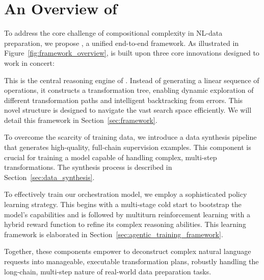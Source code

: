 



\section{An Overview of \sys} 
\label{sec:overview} 



To address the core challenge of compositional complexity in NL-\nlwhat data preparation, we propose \sys, a unified end-to-end framework. As illustrated in Figure~\ref{fig:framework_overview}, \sys is built upon three core innovations designed to work in concert:

 This is the central reasoning engine of \sys. Instead of generating a linear sequence of operations, it constructs a transformation tree, enabling dynamic exploration of different transformation paths and intelligent backtracking from errors. This novel structure is designed to navigate the vast search space efficiently. We will detail this framework in Section~\ref{sec:framework}.
    
 To overcome the scarcity of training data, we introduce a data synthesis pipeline that generates high-quality, full-chain supervision examples. This component is crucial for training a model capable of handling complex, multi-step transformations. The synthesis process is described in Section~\ref{sec:data_synthesis}.
    
 To effectively train our orchestration model, we employ a sophisticated policy learning strategy. This begins with a multi-stage cold start to bootstrap the model's capabilities and is followed by multiturn reinforcement learning with a hybrid reward function to refine its complex reasoning abilities. This learning framework is elaborated in Section~\ref{sec:agentic_training_framework}.

Together, these components empower \sys to deconstruct complex natural language requests into manageable, executable transformation plans, robustly handling the long-chain, multi-step nature of real-world data preparation tasks.